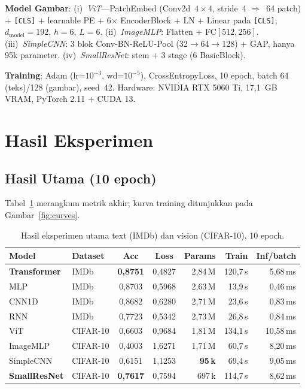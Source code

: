 \documentclass[10pt,conference,a4paper]{article}
\begin{document}
\textbf{Model Gambar}: (i)~\emph{ViT}---PatchEmbed (Conv2d~$4{\times}4$, stride~4 $\Rightarrow$~64 patch) + \texttt{[CLS]} + learnable PE + 6$\times$ EncoderBlock + LN + Linear pada \texttt{[CLS]}; $d_{\text{model}}{=}192$, $h{=}6$, $L{=}6$. (ii)~\emph{ImageMLP}: Flatten + FC$[512,256]$. (iii)~\emph{SimpleCNN}: 3 blok Conv-BN-ReLU-Pool (32$\to$64$\to$128) + GAP, hanya 95k parameter. (iv)~\emph{SmallResNet}: stem + 3 stage (6 BasicBlock).

\textbf{Training}: Adam (lr=$10^{-3}$, wd=$10^{-5}$), CrossEntropyLoss, 10 epoch, batch 64 (teks)/128 (gambar), seed~42. Hardware: NVIDIA RTX 5060 Ti, 17{,}1~GB VRAM, PyTorch 2.11 + CUDA 13.

\section{Hasil Eksperimen}

\subsection{Hasil Utama (10 epoch)}

Tabel~\ref{tab:summary} merangkum metrik akhir; kurva training ditunjukkan pada Gambar~\ref{fig:curves}.

\begin{table}[H]
  \centering
  \caption{Hasil eksperimen utama text (IMDb) dan vision (CIFAR-10), 10 epoch.}
  \label{tab:summary}
  \footnotesize
  \setlength{\tabcolsep}{4pt}
  \begin{tabular}{l l c c r r r}
    \toprule
    \textbf{Model} & \textbf{Dataset} & \textbf{Acc} & \textbf{Loss} & \textbf{Params} & \textbf{Train} & \textbf{Inf/batch} \\
    \midrule
    \textbf{Transformer} & IMDb     & \textbf{0{,}8751} & 0{,}4827 & 2{,}84\,M & 120{,}7\,s & 5{,}68\,ms \\
    MLP                  & IMDb     & 0{,}8703          & 0{,}5968 & 2{,}63\,M &  13{,}9\,s & 0{,}46\,ms \\
    CNN1D                & IMDb     & 0{,}8682          & 0{,}6280 & 2{,}71\,M &  23{,}6\,s & 0{,}83\,ms \\
    RNN                  & IMDb     & 0{,}7723          & 0{,}5342 & 2{,}73\,M &  26{,}8\,s & 0{,}84\,ms \\
    \midrule
    ViT                  & CIFAR-10 & 0{,}6603          & 0{,}9684 & 1{,}81\,M & 134{,}1\,s & 10{,}58\,ms \\
    ImageMLP             & CIFAR-10 & 0{,}4003          & 1{,}6271 & 1{,}71\,M &  60{,}7\,s &  8{,}20\,ms \\
    SimpleCNN            & CIFAR-10 & 0{,}6151          & 1{,}1253 & \textbf{95\,k} & 69{,}4\,s & 9{,}05\,ms \\
    \textbf{SmallResNet} & CIFAR-10 & \textbf{0{,}7617} & 0{,}7594 & 697\,k    & 114{,}7\,s & 8{,}62\,ms \\
    \bottomrule
  \end{tabular}
\end{table}
\end{document}

